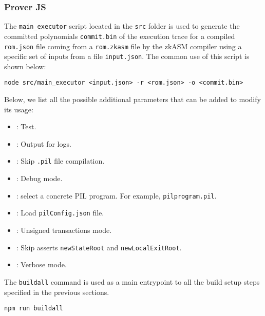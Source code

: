 \subsubsection{Prover JS}

The \texttt{main\_executor} script located in the \texttt{src} folder is used to generate the committed polynomials \texttt{commit.bin} of the execution trace for a compiled \texttt{rom.json} file coming from a \texttt{rom.zkasm} file by the zkASM compiler using a specific set of inputs from a file \texttt{input.json}. The common use of this script is shown below:

\begin{lstlisting}[style=termt]
node src/main_executor <input.json> -r <rom.json> -o <commit.bin>
\end{lstlisting}

Below, we list all the possible additional parameters that can be added to modify its usage:

\begin{itemize}


\item {}: Test.

\item {}: Output for logs.

\item {}: Skip \texttt{.pil} file compilation.

\item {}: Debug mode.

\item {}: select a concrete PIL program. For example, \texttt{pilprogram.pil}.

\item {}: Load \texttt{pilConfig.json} file.

\item {}: Unsigned transactions mode.

\item {}: Skip asserts \texttt{newStateRoot} and \texttt{newLocalExitRoot}.

\item {}: Verbose mode.


\end{itemize}


The \texttt{buildall} command is used as a main entrypoint to all the build setup steps specified in the previous sections. 

\begin{lstlisting}[style=termt]
npm run buildall 
\end{lstlisting}

